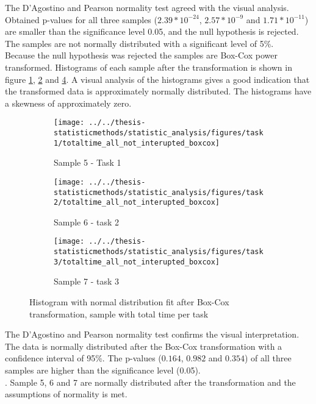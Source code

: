 The D'Agostino and Pearson normality test agreed with the visual analysis. Obtained p-values for all three samples ($2.39 * 10^{-24}$, $2.57 * 10^{-9}$ and $1.71 * 10^{-11}$) are smaller than the significance level 0.05, and the null hypothesis is rejected. The samples are not normally distributed with a significant level of 5\%.\\[0.2cm]

Because the null hypothesis was rejected the samples are Box-Cox power transformed. Histograms of each sample after the transformation is shown in figure \ref{fig:totaltimeallnotinteruptedboxcox_task1}, \ref{fig:totaltimeallnotinteruptedboxcox_task2} and \ref{fig:totaltimeallnotinteruptedboxcox_task3}. A visual analysis of the histograms gives a good indication that the transformed data is approximately normally distributed. The histograms have a skewness of approximately zero. 

\begin{figure}[h!]
	\centering
	\begin{subfigure}[b]{0.3\textwidth}
		\centering
		\texttt{[image: ../../thesis-statisticmethods/statistic\_analysis/figures/task1/totaltime\_all\_not\_interupted\_boxcox]}
		\caption{Sample 5 - Task 1}
		\label{fig:totaltimeallnotinteruptedboxcox_task1}
	\end{subfigure}
	\begin{subfigure}[b]{0.3\textwidth}
		\centering
		\texttt{[image: ../../thesis-statisticmethods/statistic\_analysis/figures/task2/totaltime\_all\_not\_interupted\_boxcox]}
		\caption{Sample 6 - task 2}
		\label{fig:totaltimeallnotinteruptedboxcox_task2}
	\end{subfigure}
	\begin{subfigure}[b]{0.3\textwidth}
		\centering
		\texttt{[image: ../../thesis-statisticmethods/statistic\_analysis/figures/task3/totaltime\_all\_not\_interupted\_boxcox]}
		\caption{Sample 7 - task 3}
		\label{fig:totaltimeallnotinteruptedboxcox_task3}
	\end{subfigure}
	\caption{Histogram with normal distribution fit after Box-Cox transformation, sample with total time per task}
\end{figure}

The D'Agostino and Pearson normality test confirms the visual interpretation. The data is normally distributed after the Box-Cox transformation with a confidence interval of 95\%. The p-values ($0.164$, $0.982$ and $0.354$) of all three samples are higher than the significance level (0.05). \\[0.2cm]. Sample 5, 6 and 7 are normally distributed after the transformation and the assumptions of normality is met. 
 
